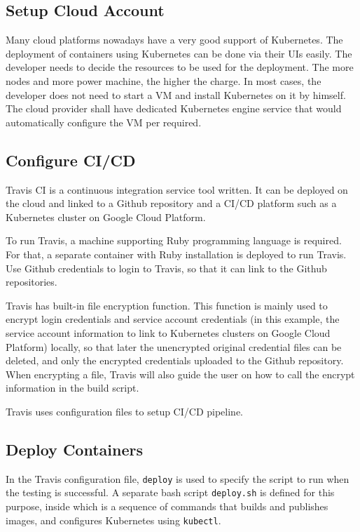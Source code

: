 \subsection{Setup Cloud Account}

Many cloud platforms nowadays have a very good support of Kubernetes. The deployment of containers using Kubernetes can be done via their UIs easily. The developer needs to decide the resources to be used for the deployment. The more nodes and more power machine, the higher the charge. In most cases, the developer does not need to start a VM and install Kubernetes on it by himself. The cloud provider shall have dedicated Kubernetes engine service that would automatically configure the VM per required.

\subsection{Configure CI/CD}

Travis CI is a continuous integration service tool written. It can be deployed on the cloud and linked to a Github repository and a CI/CD platform such as a Kubernetes cluster on Google Cloud Platform.

To run Travis, a machine supporting Ruby programming language is required. For that, a separate container with Ruby installation is deployed to run Travis. Use Github credentials to login to Travis, so that it can link to the Github repositories.

Travis has built-in file encryption function. This function is mainly used to encrypt login credentials and service account credentials (in this example, the service account information to link to Kubernetes clusters on Google Cloud Platform) locally, so that later the unencrypted original credential files can be deleted, and only the encrypted credentials uploaded to the Github repository. When encrypting a file, Travis will also guide the user on how to call the encrypt information in the build script.

Travis uses configuration files to setup CI/CD pipeline.

\subsection{Deploy Containers}

In the Travis configuration file, \verb|deploy| is used to specify the script to run when the testing is successful. A separate bash script \verb|deploy.sh| is defined for this purpose, inside which is a sequence of commands that builds and publishes images, and configures Kubernetes using \verb|kubectl|.

